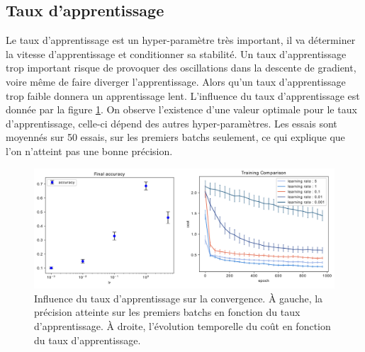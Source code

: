 \subsection{Taux d'apprentissage}
Le taux d'apprentissage est un hyper-paramètre très important, il va déterminer la vitesse d'apprentissage et conditionner sa stabilité. Un taux d'apprentissage trop important risque de provoquer des oscillations dans la descente de gradient, voire même de faire diverger l'apprentissage. Alors qu'un taux d'apprentissage trop faible donnera un apprentissage lent. L'influence du taux d'apprentissage est donnée par la figure \ref{taux_app}. On observe l'existence d'une valeur optimale pour le taux d'apprentissage, celle-ci dépend des autres hyper-paramètres. Les essais sont moyennés sur 50 essais, sur les premiers batchs seulement, ce qui explique que l'on n'atteint pas une bonne précision.

\begin{figure}[!h]
\centering
\includegraphics[width=320pt]{"images/MLP/taux_app"}
\caption{Influence du taux d'apprentissage sur la convergence. À gauche, la précision atteinte sur les premiers batchs en fonction du taux d'apprentissage. À droite, l'évolution temporelle du coût en fonction du taux d'apprentissage.}
\label{taux_app}
\end{figure}